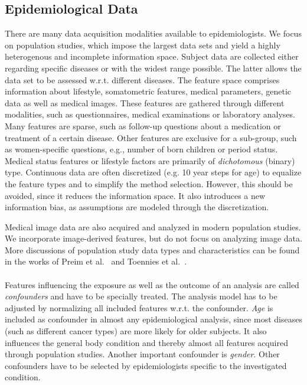 \documentclass[journal]{style/vgtc} 			          %
\begin{document}
\subsection{Epidemiological Data} \label{sec:EpidemiologicalData}
There are many data acquisition modalities available to epidemiologists. %
We focus on population studies, which impose the largest data sets and yield a highly heterogenous and incomplete information space.
Subject data are collected either regarding specific diseases or with the widest range possible.
The latter allows the data set to be assessed w.r.t. different diseases.
The feature space comprises information about lifestyle, somatometric features, medical parameters, genetic data as well as medical images.
These features are gathered through different modalities, such as questionnaires, medical examinations or laboratory analyses.
Many features are sparse, such as follow-up questions about a medication or treatment of a certain disease.
Other features are exclusive for a sub-group, such as women-specific questions, e.g., number of born children or period status.
Medical status features or lifestyle factors are primarily of \emph{dichotomous} (binary) type.
Continuous data are often discretized (e.g. 10 year steps for age) to equalize the feature types and to simplify the method selection.
However, this should be avoided, since it reduces the information space.
It also introduces a new information bias, as assumptions are modeled through the discretization.

Medical image data are also acquired and analyzed in modern population studies.
We incorporate image-derived features, but do not focus on analyzing image data.
More discussions of population study data types and characteristics can be found in the works of Preim et al.~\cite{Preim2014} and Toennies et al.~\cite{Toennies2015}.
\\\\
Features influencing the exposure as well as the outcome of an analysis are called \emph{confounders} and have to be specially treated.
The analysis model has to be adjusted by normalizing all included features w.r.t. the confounder.
\emph{Age} is included as confounder in almost any epidemiological analysis, since most diseases (such as different cancer types) are more likely for older subjects.
It also influences the general body condition and thereby almost all features acquired through population studies.
Another important confounder is \emph{gender}.
Other confounders have to be selected by epidemiologists specific to the investigated condition.
\end{document}
